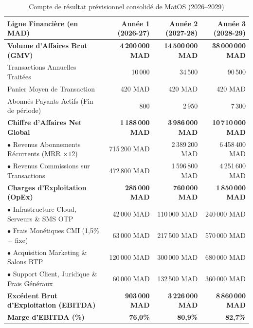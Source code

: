 \documentclass[11pt,a4paper]{report}
\begin{document}
\begin{table}[h!]
\centering
\small
\begin{tabularx}{\textwidth}{l r r r}
\toprule
\textbf{Ligne Financière (en MAD)} & \textbf{Année 1 (2026-27)} & \textbf{Année 2 (2027-28)} & \textbf{Année 3 (2028-29)} \\
\midrule
\textbf{Volume d'Affaires Brut (GMV)} & \textbf{4\,200\,000 MAD} & \textbf{14\,500\,000 MAD} & \textbf{38\,000\,000 MAD} \\
Transactions Annuelles Traitées & 10\,000 & 34\,500 & 90\,500 \\
Panier Moyen de Transaction & 420 MAD & 420 MAD & 420 MAD \\
Abonnés Payants Actifs (Fin de période) & 800 & 2\,950 & 7\,300 \\
\midrule
\textbf{Chiffre d'Affaires Net Global} & \textbf{1\,188\,000 MAD} & \textbf{3\,986\,000 MAD} & \textbf{10\,710\,000 MAD} \\
$\bullet$ Revenus Abonnements Récurrents (MRR $\times 12$) & 715\,200 MAD & 2\,389\,200 MAD & 6\,458\,400 MAD \\
$\bullet$ Revenus Commissions sur Transactions & 472\,800 MAD & 1\,596\,800 MAD & 4\,251\,600 MAD \\
\midrule
\textbf{Charges d'Exploitation (OpEx)} & \textbf{285\,000 MAD} & \textbf{760\,000 MAD} & \textbf{1\,850\,000 MAD} \\
$\bullet$ Infrastructure Cloud, Serveurs \& SMS OTP & 42\,000 MAD & 110\,000 MAD & 240\,000 MAD \\
$\bullet$ Frais Monétiques CMI (1,5\% + fixe) & 63\,000 MAD & 217\,500 MAD & 570\,000 MAD \\
$\bullet$ Acquisition Marketing \& Salons BTP & 120\,000 MAD & 300\,000 MAD & 680\,000 MAD \\
$\bullet$ Support Client, Juridique \& Frais Généraux & 60\,000 MAD & 132\,500 MAD & 360\,000 MAD \\
\midrule
\textbf{Excédent Brut d'Exploitation (EBITDA)} & \textbf{903\,000 MAD} & \textbf{3\,226\,000 MAD} & \textbf{8\,860\,000 MAD} \\
\textbf{Marge d'EBITDA (\%)} & \textbf{76,0\%} & \textbf{80,9\%} & \textbf{82,7\%} \\
\bottomrule
\end{tabularx}
\caption{Compte de résultat prévisionnel consolidé de MatOS (2026--2029)}
\end{table}
\end{document}
